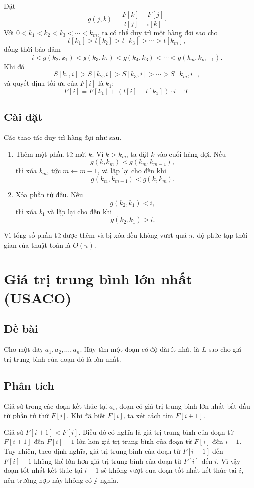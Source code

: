 \documentclass[11pt]{article}
\begin{document}
Đặt
\[
  g(j,k)=\frac{F[k]-F[j]}{t[j]-t[k]}.
\]
Với $0<k_1<k_2<k_3<\cdots<k_m$, ta có thể duy trì một hàng đợi sao cho
\[
  t[k_1]>t[k_2]>t[k_3]>\cdots>t[k_m],
\]
đồng thời bảo đảm
\[
  i<g(k_2,k_1)<g(k_3,k_2)<g(k_4,k_3)<\cdots<g(k_m,k_{m-1}).
\]
Khi đó
\[
  S[k_1,i]>S[k_2,i]>S[k_3,i]>\cdots>S[k_m,i],
\]
và quyết định tối ưu của $F[i]$ là $k_1$:
\[
  F[i]=F[k_1]+(t[i]-t[k_1])\cdot i-T.
\]

\subsection*{Cài đặt}

Các thao tác duy trì hàng đợi như sau.

\begin{enumerate}
  \item Thêm một phần tử mới $k$. Vì $k>k_m$, ta đặt $k$ vào cuối hàng đợi.
  Nếu
  \[
    g(k,k_m)<g(k_m,k_{m-1}),
  \]
  thì xóa $k_m$, tức $m\leftarrow m-1$, và lặp lại cho đến khi
  \[
    g(k_m,k_{m-1})<g(k,k_m).
  \]

  \item Xóa phần tử đầu. Nếu
  \[
    g(k_2,k_1)<i,
  \]
  thì xóa $k_1$ và lặp lại cho đến khi
  \[
    g(k_2,k_1)>i.
  \]
\end{enumerate}

Vì tổng số phần tử được thêm và bị xóa đều không vượt quá $n$, độ phức tạp
thời gian của thuật toán là $O(n)$.

\section{Giá trị trung bình lớn nhất (USACO)}

\subsection*{Đề bài}

Cho một dãy $a_1,a_2,\ldots,a_n$. Hãy tìm một đoạn có độ dài ít nhất là $L$
sao cho giá trị trung bình của đoạn đó là lớn nhất.

\subsection*{Phân tích}

Giả sử trong các đoạn kết thúc tại $a_i$, đoạn có giá trị trung bình lớn nhất
bắt đầu từ phần tử thứ $F[i]$. Khi đã biết $F[i]$, ta xét cách tìm $F[i+1]$.

Giả sử $F[i+1]<F[i]$. Điều đó có nghĩa là giá trị trung bình của đoạn từ
$F[i+1]$ đến $F[i]-1$ lớn hơn giá trị trung bình của đoạn từ $F[i]$ đến
$i+1$. Tuy nhiên, theo định nghĩa, giá trị trung bình của đoạn từ $F[i+1]$ đến
$F[i]-1$ không thể lớn hơn giá trị trung bình của đoạn từ $F[i]$ đến $i$.
Vì vậy đoạn tốt nhất kết thúc tại $i+1$ sẽ không vượt qua đoạn tốt nhất kết
thúc tại $i$, nên trường hợp này không có ý nghĩa.
\end{document}
